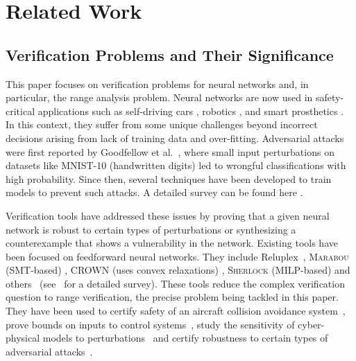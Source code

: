 \section{Related Work}\label{sec:related}

\subsection{Verification Problems and Their Significance}

This paper focuses on verification problems for neural networks and, in particular, the range analysis problem.  Neural networks are now used in safety-critical applications such as self-driving cars \cite{bojarski_testa_2016}, robotics \cite{gu2017deep}, and smart prosthetics \cite{clark_campbell_amor}. In this context, they suffer from some unique challenges beyond incorrect decisions arising from lack of training data and over-fitting. Adversarial attacks were first reported by Goodfellow et al.~\cite{goodfellow_shlens_szegedy_2015}, where small input perturbations on datasets like MNIST-10 (handwritten digits) led to wrongful classifications with high probability. Since then, several techniques have been developed to train models to prevent such attacks. A detailed survey can be found here \cite{bai2021recent,silva2020opportunities}.

Verification tools have  addressed these issues by proving that a given neural network is robust to certain types of perturbations or synthesizing a counterexample that shows a vulnerability in the network. Existing tools have been focused on feedforward neural networks. They  include Reluplex~\cite{katz_barrett_dill_julian_kochenderfer_2017}, \textsc{Marabou} (SMT-based) \cite{katz_huang_2019}, \textsc{CROWN} (uses convex relaxations) \cite{zhang_weng_chen_hsieh_daniel_2018},  \textsc{Sherlock} (MILP-based) \cite{dutta_chen_jha_sriram_sankaranarayanan_tiwari_2019} and others~\cite{lomuscio_maganti_2017} (see~\cite{Huang2020Survey,Liu+Others/2021/Algorithms,albarghouthi-book} for a detailed survey). These tools reduce the complex verification question to  range verification, the precise problem being tackled in this paper. 
They have been used to certify safety of an aircraft collision avoidance system~\cite{Irfan+Others/2020/Towards,katz_barrett_dill_julian_kochenderfer_2017}, prove bounds on inputs to control systems~\cite{Majid+Others/2022/Safe}, study the sensitivity of cyber-physical models to perturbations~\cite{Kushner+Sankaranarayanan+Breton/2020/Conformance} and certify robustness to certain types of adversarial attacks~\cite{tjeng_xiao_tedrake_2017,Singh+Others/2019/Beyond}. 

